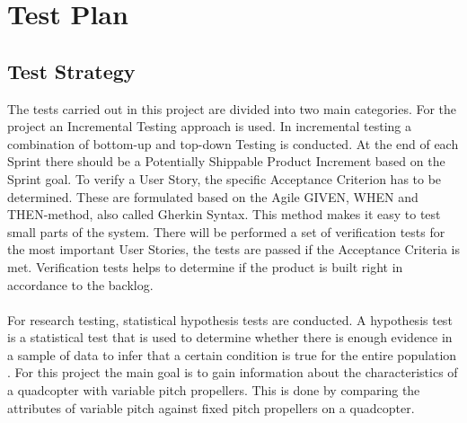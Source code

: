 \chapter{Test Plan}
\section{Test Strategy}

The tests carried out in this project are divided into two main categories. For the project an Incremental Testing approach is used. In incremental testing a combination of bottom-up and top-down Testing is conducted. At the end of each Sprint there should be a Potentially Shippable Product Increment based on the Sprint goal. To verify a User Story, the specific Acceptance Criterion has to be determined. These are formulated based on the Agile GIVEN, WHEN and THEN-method, also called Gherkin Syntax. This method makes it easy to test small parts of the system. There will be performed a set of verification tests for the most important User Stories, the tests are passed if the Acceptance Criteria is met. Verification tests helps to determine if the product is built right in accordance to the backlog.\\
\\
For research testing, statistical hypothesis tests are conducted. A hypothesis test is a statistical test that is used to determine whether there is enough evidence in a sample of data to infer that a certain condition is true for the entire population \cite{statistikk3}. For this project the main goal is to gain information about the characteristics of a quadcopter with variable pitch propellers. This is done by comparing the attributes of variable pitch against fixed pitch propellers on a quadcopter. \\

\newpage

